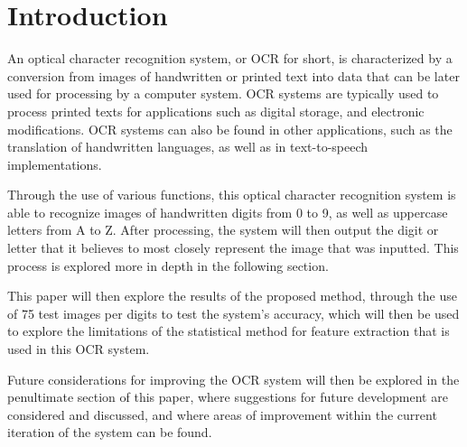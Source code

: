 \documentclass[twocolumn]{article}
\begin{document}
\section{Introduction}
An optical character recognition system, or OCR for short, is characterized by a conversion from images of handwritten or printed text into data that can be later used for processing by a computer system. OCR systems are typically used to process printed texts for applications such as digital storage, and electronic modifications. OCR systems can also be found in other applications, such as the translation of handwritten languages, as well as in text-to-speech implementations. \par
Through the use of various functions, this optical character recognition system is able to recognize images of handwritten digits from 0 to 9, as well as uppercase letters from A to Z. After processing, the system will then output the digit or letter that it believes to most closely represent the image that was inputted. This process is explored more in depth in the following section.  \par
This paper will then explore the results of the proposed method, through the use of 75 test images per digits to test the system’s accuracy, which will then be used to explore the limitations of the statistical method for feature extraction that is used in this OCR system. \par
Future considerations for improving the OCR system will then be explored in the penultimate section of this paper, where suggestions for future development are considered and discussed, and where areas of improvement within the current iteration of the system can be found. \par
\end{document}
